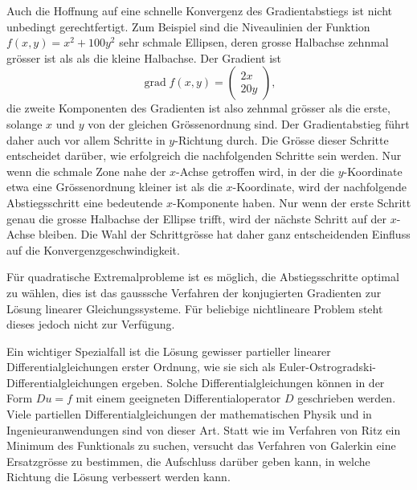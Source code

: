 Auch die Hoffnung auf eine schnelle Konvergenz des Gradientabstiegs ist
nicht unbedingt gerechtfertigt.
Zum Beispiel sind die Niveaulinien der Funktion
\(
f(x,y)
=
x^2+100 y^2
\)
sehr schmale Ellipsen, deren grosse Halbachse zehnmal grösser ist als
als die kleine Halbachse.
Der Gradient ist
\[
\operatorname{grad} f(x,y)
=
\begin{pmatrix}
2x\\
20y
\end{pmatrix},
\]
die zweite Komponenten des Gradienten ist also zehnmal grösser als
die erste, solange $x$ und $y$ von der gleichen Grössenordnung sind.
Der Gradientabstieg führt daher auch vor allem Schritte in $y$-Richtung
durch.
Die Grösse dieser Schritte entscheidet darüber, wie erfolgreich die
nachfolgenden Schritte sein werden.
Nur wenn die schmale Zone nahe der $x$-Achse getroffen wird, in der
die $y$-Koordinate etwa eine Grössenordnung kleiner ist als die
$x$-Koordinate, wird der nachfolgende Abstiegsschritt eine bedeutende
$x$-Komponente haben.
Nur wenn der erste Schritt genau die grosse Halbachse der Ellipse
trifft, wird der nächste Schritt auf der $x$-Achse bleiben.
Die Wahl der Schrittgrösse hat daher ganz entscheidenden Einfluss
auf die Konvergenzgeschwindigkeit.

Für quadratische Extremalprobleme ist es möglich, die Abstiegsschritte
optimal zu wählen, dies ist das gausssche Verfahren der konjugierten
Gradienten zur Lösung linearer Gleichungssysteme.
Für beliebige nichtlineare Problem steht dieses jedoch nicht zur
Verfügung.

Ein wichtiger Spezialfall ist die Lösung gewisser partieller
linearer Differentialgleichungen erster Ordnung, wie sie sich als
Euler-Ostrogradski-Differentialgleichungen ergeben.
Solche Differentialgleichungen können in der Form
$Du=f$ mit einem geeigneten Differentialoperator $D$
geschrieben werden.
Viele partiellen Differentialgleichungen der mathematischen
Physik und in Ingenieuranwendungen sind von dieser Art.
Statt wie im Verfahren von Ritz ein Minimum des Funktionals zu
suchen, versucht das Verfahren von Galerkin eine Ersatzgrösse
zu bestimmen, die Aufschluss darüber geben kann, in welche Richtung
die Lösung verbessert werden kann.

